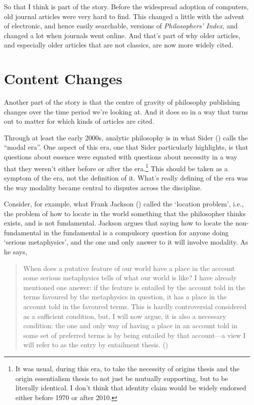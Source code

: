 \documentclass[
  12pt,
  letterpaper,
  DIV=11,
  numbers=noendperiod]{scrartcl}
\begin{document}
So that I think is part of the story. Before the widespread adoption of
computers, old journal articles were very hard to find. This changed a
little with the advent of electronic, and hence easily searchable,
versions of \emph{Philosophers' Index}, and changed a lot when journals
went online. And that's part of why older articles, and especially older
articles that are not classics, are now more widely cited.

\section{Content Changes}\label{sec-content}

Another part of the story is that the centre of gravity of philosophy
publishing changes over the time period we're looking at. And it does so
in a way that turns out to matter for which kinds of articles are cited.

Through at least the early 2000s, analytic philosophy is in what Sider
() calls the ``modal era''. One aspect
of this era, one that Sider particularly highlights, is that questions
about essence were equated with questions about necessity in a way that
they weren't either before or after the era.\footnote{It was usual,
  during this era, to take the necessity of origins thesis and the
  origin essentialism thesis to not just be mutually supporting, but to
  be literally identical. I don't think that identity claim would be
  widely endorsed either before 1970 or after 2010.} This should be
taken as a symptom of the era, not the definition of it. What's really
defining of the era was the way modality became central to disputes
across the discipline.

Consider, for example, what Frank Jackson
() called the `location problem', i.e.,
the problem of how to locate in the world something that the philosopher
thinks exists, and is not fundamental. Jackson argues that saying how to
locate the non-fundamental in the fundamental is a compulsory question
for anyone doing `serious metaphysics', and the one and only answer to
it will involve modality. As he says,

\begin{quote}
When does a putative feature of our world have a place in the account
some serious metaphysics tells of what our world is like? I have already
mentioned one answer: if the feature is entailed by the account told in
the terms favoured by the metaphysics in question, it has a place in the
account told in the favoured terms. This is hardly controversial
considered as a sufficient condition, but, I will now argue, it is also
a necessary condition: the one and only way of having a place in an
account told in some set of preferred terms is by being entailed by that
account---a view I will refer to as the entry by entailment thesis.
()
\end{quote}
\end{document}

